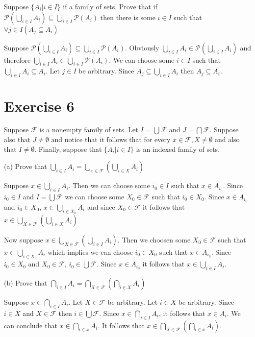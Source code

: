 \documentclass[11pt]{article}
\newcommand{\powerset}[1]{\mathscr{P}(#1)}
\newcommand{\family}[1]{\mathcal{#1}}
\begin{document}
Suppose $\{A_i | i \in I \}$ if a family of sets. Prove that if 
$\powerset{\bigcup_{i \in I} A_i} \subseteq \bigcup_{i \in I} \powerset{A_i}$ 
then there is some $i \in I$ such that $\forall j \in I (A_j \subseteq A_i)$

Suppose 
$\powerset{\bigcup_{i \in I} A_i} \subseteq \bigcup_{i \in I} \powerset{A_i}$.
Obviously $\bigcup_{i \in I} A_i \in \powerset{\bigcup_{i \in I} A_i}$ and 
therefore $\bigcup_{i \in I} A_i \in \bigcup_{i \in I} \powerset{A_i}$. We can 
choose some $i \in I$ such that $\bigcup_{i \in I} A_i \subseteq A_i$. Let 
$j \in I$ be arbitrary. Since $A_j \subseteq \bigcup_{i \in I} A_i$ then 
$A_j \subseteq A_i$.

\section*{Exercise 6}

Suppose $\family{F}$ is a nonempty family of sets. Let $I = \bigcup \family{F}$
and $J = \bigcap \family{F}$. Suppose also that $J \neq \emptyset$ and notice 
that it follows that for every $x \in \family{F}, X \neq \emptyset$ and also 
that $I \neq \emptyset$. Finally, suppose that $\{ A_i | i \in I \}$ is an 
indexed family of sets.

\noindent (a) Prove that $\bigcup_{i \in I} A_i = \bigcup_{x \in \family{F}} (\bigcup_{i \in X} A_i)$

Suppose $x \in \bigcup_{i \in I} A_i$. Then we can choose some $i_0 \in I$ such 
that $x \in A_{i_0}$. Since $i_0 \in I$ and $I = \bigcup \family{F}$ we can choose 
some $X_0 \in \family{F}$ such that $i_0 \in X_0$. Since $x \in A_{i_0}$ and 
$i_0 \in X_0$, $x \in \bigcup_{i \in X_0} A_i$ and since $X_0 \in \family{F}$
it follows that $x \in \bigcup_{X \in \family{F}} (\bigcup_{i \in X} A_i)$

Now suppose $x \in \bigcup_{X \in \family{F}} (\bigcup_{i \in I} A_i)$. Then 
we choosen some $X_0 \in \family{F}$ such that $x \in \bigcup_{i \in X_0} A_i$
which implies we can choose $i_0 \in X_0$ such that $x \in A_{i_0}$. Since 
$i_0 \in X_0$ and $X_0 \in \family{F}$, $i_0 \in \bigcup \family{F}$. Since 
$x \in A_{i_0}$ it follows that $x \in \bigcup_{i \in I} A_i$.

\noindent (b) Prove that $\bigcap_{i \in I} A_i = \bigcap_{X \in \family{F}} (\bigcap_{i \in X} A_i)$

Suppose $x \in \bigcap_{i \in I} A_i$. Let $X \in \family{F}$ be arbitrary. 
Let $i \in X$ be arbitrary. Since $i \in X$ and $X \in \family{F}$ then 
$i \in \bigcup \family{F}$. Since $x \in \bigcap_{i \in I} A_i$, it follows that 
$x \in A_i$. We can conclude that $x \in \bigcap_{i \in x} A_i$. It follows that 
$x \in \bigcap_{X \in \family{F}} (\bigcap_{i \in x} A_i)$.
\end{document}
